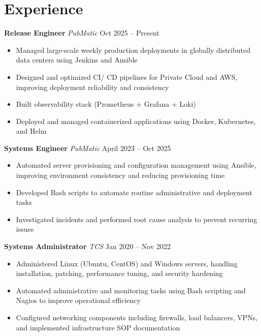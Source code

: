 \documentclass[10pt, letterpaper]{article}
\begin{document}
\section{Experience}

\textbf{Release Engineer} \hfill \textit {PubMatic} \hfill \textcolor{mutedtext}{Oct 2025 -- Present}
\begin{itemize}
  \item Managed large-scale weekly production deployments in globally distributed data centers using Jenkins and Ansible
  \item Designed and optimized CI/ CD pipelines for Private Cloud and AWS, improving deployment reliability and consistency
  \item Built observability stack (Prometheus + Grafana + Loki)
  \item Deployed and managed containerized applications using Docker, Kubernetes, and Helm
\end{itemize}

\vspace{4pt}

\textbf{Systems Engineer} \hfill \textit{PubMatic} \hfill \textcolor{mutedtext}{April 2023 -- Oct 2025}
\begin{itemize}
  \item Automated server provisioning and configuration management using Ansible, improving environment consistency and reducing provisioning time
  \item Developed Bash scripts to automate routine administrative and deployment tasks
  \item Investigated incidents and performed root cause analysis to prevent recurring issues
\end{itemize}

\vspace{4pt}

\textbf{Systems Administrator} \hfill \textit{TCS} \hfill \textcolor{mutedtext}{Jan 2020 -- Nov 2022}
\begin{itemize}
  \item Administered Linux (Ubuntu, CentOS) and Windows servers, handling installation, patching, performance tuning, and security hardening
  \item Automated administrative and monitoring tasks using Bash scripting and Nagios to improve operational efficiency
  \item Configured networking components including firewalls, load balancers, VPNs, and implemented infrastructure SOP documentation
\end{itemize}
\end{document}
